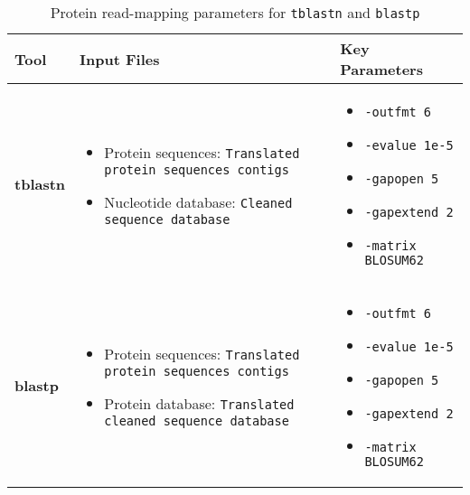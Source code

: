 \documentclass[11pt]{report}
\begin{document}
	
\begin{table}[h!]
	\centering
	\begin{adjustbox}{max width=\linewidth}
		\begin{tabular}{|p{3cm}|p{4cm}|p{5cm}|}
			\hline
			\textbf{Tool} & \textbf{Input Files} & \textbf{Key Parameters} \\ \hline
			\textbf{tblastn} & 
			\begin{itemize}
				\item Protein sequences: \texttt{Translated protein sequences contigs}
				\item Nucleotide database: \texttt{Cleaned sequence database}
			\end{itemize} 
			& 
			\begin{itemize}
				\item \texttt{-outfmt 6}
				\item \texttt{-evalue 1e-5}
				\item \texttt{-gapopen 5}
				\item \texttt{-gapextend 2}
				\item \texttt{-matrix \texttt{BLOSUM62}}
			\end{itemize} \\ \hline
			
			\textbf{blastp} & 
			\begin{itemize}
				\item Protein sequences: \texttt{Translated protein sequences contigs}
				\item Protein database: \texttt{Translated cleaned sequence database}
			\end{itemize} 
			& 
			\begin{itemize}
				\item \texttt{-outfmt 6}
				\item \texttt{-evalue 1e-5}
				\item \texttt{-gapopen 5}
				\item \texttt{-gapextend 2}
				\item \texttt{-matrix \texttt{BLOSUM62}}
			\end{itemize} \\ \hline
			
		\end{tabular}
	\end{adjustbox}
	\caption{Protein read-mapping parameters for \texttt{tblastn} and \texttt{blastp}}
	\label{tab:protein_read_mapping}
	
\end{table}
\end{document}

